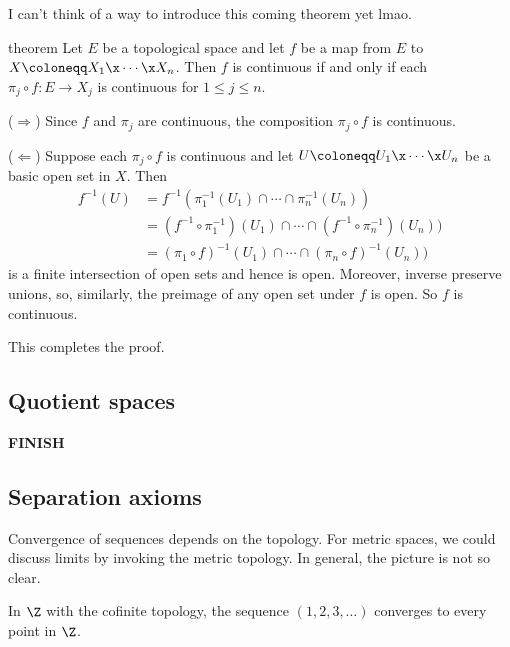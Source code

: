 \documentclass[class=article, crop=false]{standalone}
\begin{document}
I can't think of a way to introduce this coming theorem yet lmao.
\begin{result}{theorem}
  Let $E$ be a topological space and let $f$ be a map from $E$ to $X \coloneqq X_1 \x \cdots \x X_n$. Then $f$ is continuous if and only if each $\pi_j \circ f \colon E \to X_j$ is continuous for $1 \leq j \leq n$.
\end{result}
\begin{pf}
  ($\Rightarrow$) Since $f$ and $\pi_j$ are continuous, the composition $\pi_j \circ f$ is continuous.

  ($\Leftarrow$) Suppose each $\pi_j \circ f$ is continuous and let $U \coloneqq U_1 \x\cdots\x U_n$ be a basic open set in $X$. Then
    \begin{align*}
      f^{-1}(U) &= f^{-1}(\pi_1^{-1} (U_1) \cap \cdots \cap \pi_n^{-1}(U_n)) \\
        &= (f^{-1} \circ \pi_1^{-1})(U_1) \cap \cdots \cap (f^{-1}\circ \pi_n^{-1})(U_n)) \\
        &= (\pi_1 \circ f)^{-1}(U_1) \cap \cdots \cap (\pi_n \circ f)^{-1}(U_n))
    \end{align*}
  is a finite intersection of open sets and hence is open. Moreover, inverse preserve unions, so, similarly, the preimage of any open set under $f$ is open. So $f$ is continuous.

  This completes the proof.
\end{pf}










\subsection{Quotient spaces}
\textbf{FINISH}










\subsection{Separation axioms}

Convergence of sequences depends on the topology. For metric spaces, we could discuss limits by invoking the metric topology. In general, the picture is not so clear.

\begin{ex}
  In $\Z$ with the cofinite topology, the sequence $(1,2,3,\ldots)$ converges to every point in $\Z$.
\end{ex}
\end{document}
